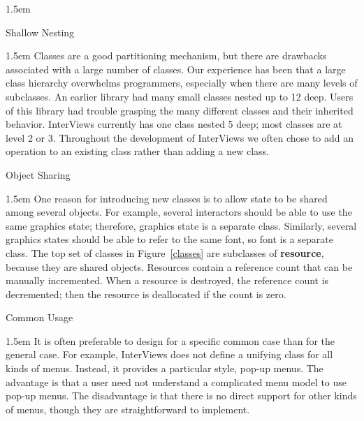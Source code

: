 \begin{list}{}{\leftmargin1.5em}
\item
Shallow Nesting
\begin{indentpar}{1.5em}
Classes are a good partitioning mechanism,
but there are drawbacks associated with a large number of classes.
Our experience
has been that a large class hierarchy overwhelms programmers,
especially when there are many levels of subclasses.
An earlier library had many small classes nested up to 12 deep.
Users of this library had trouble grasping the many different classes and
their inherited behavior.
InterViews currently has one class nested 5 deep;
most classes are at level 2 or 3.
Throughout the development of InterViews
we often chose to add an operation to an existing class
rather than adding a new class.
\end{indentpar}

\item
Object Sharing
\begin{indentpar}{1.5em}
One reason for introducing new classes is to allow state to be shared
among several objects.  For example, several interactors should be
able to use the same graphics state; therefore, graphics state
is a separate class.  Similarly, several graphics states should
be able to refer to the same font, so font is a separate class.
The top set of classes in Figure~\ref{classes} are subclasses 
of {\bf resource}, because they are shared objects.
Resources contain a reference count that can be manually incremented.
When a resource is destroyed, the reference count is decremented; then
the resource is deallocated if the count is zero.
\end{indentpar}

\item
Common Usage
\begin{indentpar}{1.5em}
It is often preferable to design for a specific common case
than for the general case.
For example, InterViews does not define a unifying class
for all kinds of menus.  Instead, it provides a particular style, pop-up menus.
The advantage is that a user need not understand a complicated
menu model to use pop-up menus.
The disadvantage is that there is no direct support
for other kinds of menus, though they are straightforward
to implement.
\end{indentpar}
\end{list}

